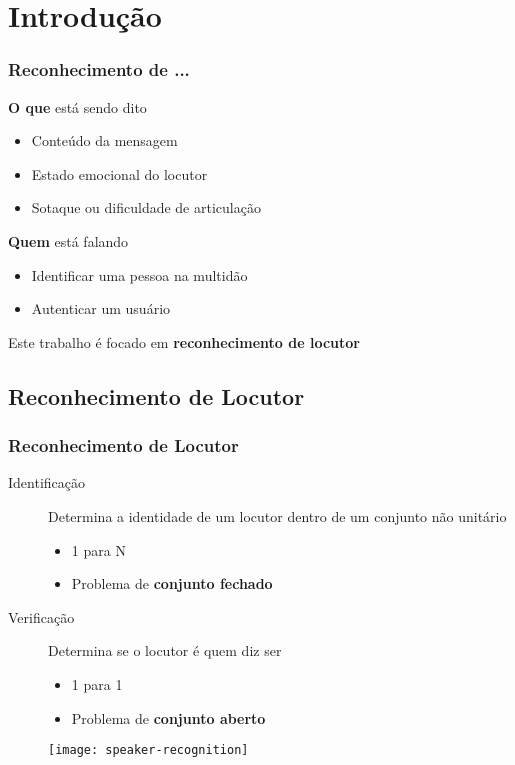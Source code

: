 \section{Introdução}
\label{sec:intro}

\contentscurrent

\begin{frame}
\frametitle{Reconhecimento de ...}
\begin{description}
    \item[Fala] \textbf{O que} está sendo dito
    \pause
    \begin{itemize}
        \item Conteúdo da mensagem
        \pause
        \item Estado emocional do locutor
        \pause
        \item Sotaque ou dificuldade de articulação
        \pause
    \end{itemize}
    \item[Locutor] \textbf{Quem} está falando
    \pause
    \begin{itemize}
        \item Identificar uma pessoa na multidão
        \pause
        \item Autenticar um usuário
        \pause
    \end{itemize}
    \item Este trabalho é focado em \textbf{reconhecimento de locutor}
\end{description}
\end{frame}

\subsection{Reconhecimento de Locutor}

\begin{frame}
\frametitle{Reconhecimento de Locutor}
\begin{description}
    \item[Identificação] Determina a identidade de um locutor dentro de um conjunto não unitário
    \pause
    \begin{itemize}
        \item 1 para N
        \pause
        \item Problema de \textbf{conjunto fechado}
        \pause
    \end{itemize}
    \item[Verificação] Determina se o locutor é quem diz ser
    \pause
    \begin{itemize}
        \item 1 para 1
        \pause
        \item Problema de \textbf{conjunto aberto}
        \pause
    \end{itemize}
\end{description}

\begin{figure}
    \centering
    \texttt{[image: speaker-recognition]}
\end{figure}
\end{frame}


